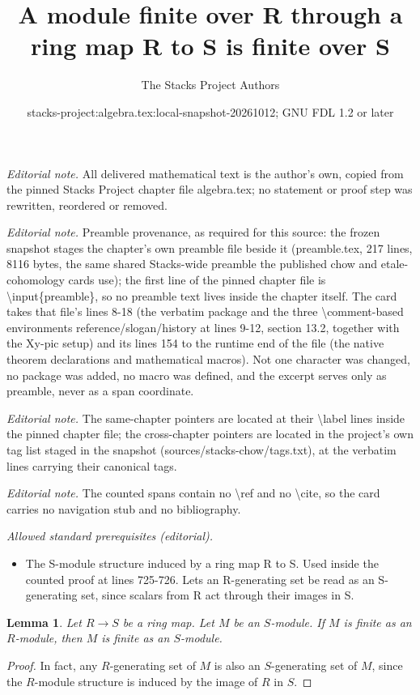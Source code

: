\documentclass[10pt,a4paper]{amsart}
\title{A module finite over R through a ring map R to S is finite over S}
\author{The Stacks Project Authors}
\date{stacks-project:algebra.tex:local-snapshot-20261012; GNU FDL 1.2 or later}
\theoremstyle{plain}
\newtheorem{lemma}[subsection]{Lemma}
\theoremstyle{definition}
\theoremstyle{remark}
\numberwithin{equation}{subsection}
\begin{document}
\maketitle
\noindent\textit{Editorial note.} All delivered mathematical text is the author's own, copied from the pinned Stacks Project chapter file algebra.tex; no statement or proof step was rewritten, reordered or removed.\par\medskip
\noindent\textit{Editorial note.} Preamble provenance, as required for this source: the frozen snapshot stages the chapter's own preamble file beside it (preamble.tex, 217 lines, 8116 bytes, the same shared Stacks-wide preamble the published chow and etale-cohomology cards use); the first line of the pinned chapter file is \textbackslash{}input\{preamble\}, so no preamble text lives inside the chapter itself. The card takes that file's lines 8-18 (the verbatim package and the three \textbackslash{}comment-based environments reference/slogan/history at lines 9-12, section 13.2, together with the Xy-pic setup) and its lines 154 to the runtime end of the file (the native theorem declarations and mathematical macros). Not one character was changed, no package was added, no macro was defined, and the excerpt serves only as preamble, never as a span coordinate.\par\medskip
\noindent\textit{Editorial note.} The same-chapter pointers are located at their \textbackslash{}label lines inside the pinned chapter file; the cross-chapter pointers are located in the project's own tag list staged in the snapshot (sources/stacks-chow/tags.txt), at the verbatim lines carrying their canonical tags.\par\medskip
\noindent\textit{Editorial note.} The counted spans contain no \textbackslash{}ref and no \textbackslash{}cite, so the card carries no navigation stub and no bibliography.\par\medskip
\noindent\textit{Allowed standard prerequisites (editorial).}\begin{itemize}
\item The S-module structure induced by a ring map R to S. Used inside the counted proof at lines 725-726. Lets an R-generating set be read as an S-generating set, since scalars from R act through their images in S.
\end{itemize}\medskip
\begin{lemma}
\label{lemma-finite-over-subring}
Let $R \to S$ be a ring map.
Let $M$ be an $S$-module.
If $M$ is finite as an $R$-module, then $M$ is finite as an $S$-module.
\end{lemma}

\begin{proof}
In fact, any $R$-generating set of $M$ is also an $S$-generating set of
$M$, since the $R$-module structure is induced by the image of $R$ in $S$.
\end{proof}
\end{document}

